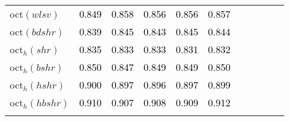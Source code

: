 \begin{tabular}[t]{l|>{}cccc>{}c|ccccc}
oct$(wlsv)$ & \textcolor{black}{0.849} & \textcolor{black}{0.858} & \textcolor{black}{0.856} & \textcolor{black}{0.856} & \textcolor{black}{0.857} &  &  &  &  & \\
oct$(bdshr)$ & \textcolor{black}{0.839} & \textcolor{black}{0.845} & \textcolor{black}{0.843} & \textcolor{black}{0.845} & \textcolor{black}{0.844} &  &  &  &  & \\
oct$_h(shr)$ & \textcolor{black}{0.835} & \textcolor{black}{0.833} & \textcolor{black}{0.833} & \textcolor{black}{0.831} & \textcolor{black}{0.832} &  &  &  &  & \\
oct$_h(bshr)$ & \textcolor{black}{0.850} & \textcolor{black}{0.847} & \textcolor{black}{0.849} & \textcolor{black}{0.849} & \textcolor{black}{0.850} &  &  &  &  & \\
oct$_h(hshr)$ & \textcolor{black}{0.900} & \textcolor{black}{0.897} & \textcolor{black}{0.896} & \textcolor{black}{0.897} & \textcolor{black}{0.899} &  &  &  &  & \\
oct$_h(hbshr)$ & \textcolor{black}{0.910} & \textcolor{black}{0.907} & \textcolor{black}{0.908} & \textcolor{black}{0.909} & \textcolor{black}{0.912} &  &  &  &  & \\
\bottomrule
{}\\
\end{tabular}
